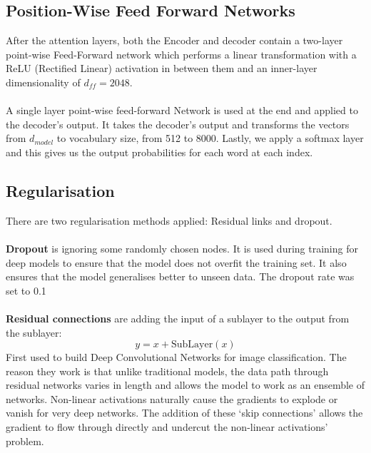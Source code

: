 \documentclass[12pt,a4paper,twoside,openright]{report}
\begin{document}



\subsection{Position-Wise Feed Forward Networks}
\label{fc2}
After the attention layers, both the Encoder and decoder contain a two-layer point-wise Feed-Forward network which performs a linear transformation with a ReLU (Rectified Linear\cite{relu}) activation in between them and an inner-layer dimensionality of $d_{ff}=2048$.
\\\\
A single layer point-wise feed-forward Network is used at the end and applied to the decoder's output. It takes the decoder's output and transforms the vectors from $d_{model}$ to vocabulary size, from 512 to 8000. Lastly, we apply a softmax layer and this gives us the output probabilities for each word at each index.

\subsection{Regularisation}
\label{regularization}
There are two regularisation methods applied: Residual links and dropout.
\\\\
\textbf{Dropout}\cite{dropout} is ignoring some randomly chosen nodes. It is used during training for deep models to ensure that the model does not overfit the training set. It also ensures that the model generalises better to unseen data. The dropout rate was set to 0.1
\\\\
\textbf{Residual connections}\cite{residual-connections} are adding the input of a sublayer to the output from the sublayer:
\[ y = x + \text{SubLayer}(x)\]
First used to build Deep Convolutional Networks for image classification. The reason they work is that
unlike traditional models, the data path through residual networks varies in length and allows the model to work as an ensemble of networks. Non-linear activations naturally cause the gradients to explode or vanish for very deep networks. The addition of these `skip connections' allows the gradient to flow through directly and undercut the non-linear activations' problem.
\end{document}
